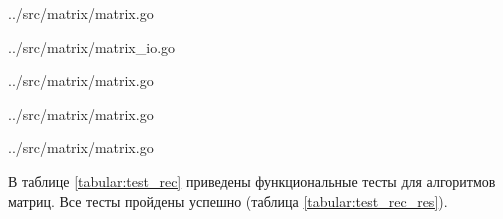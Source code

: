 \begin{lstinputlisting}[
	caption={Генератор матрицы},
	label={lst:generator},
	style={go},
	linerange={8-23},
	]{../src/matrix/matrix.go}
\end{lstinputlisting}

\begin{lstinputlisting}[
	caption={Функция для выделения памяти},
	label={lst:allocator},
	style={go},
	linerange={31-40},
	]{../src/matrix/matrix_io.go}
\end{lstinputlisting}

\begin{lstinputlisting}[
	caption={Классический алгоритм},
	label={lst:classic},
	style={go},
	linerange={29-39},
	]{../src/matrix/matrix.go}
\end{lstinputlisting}

\clearpage

\begin{lstinputlisting}[
	caption={Алгоритм Винограда без оптимизации},
	label={lst:winograd},
	style={go},
	linerange={41-82},
	]{../src/matrix/matrix.go}
\end{lstinputlisting}

\clearpage

\begin{lstinputlisting}[
	caption={Алгоритм Винограда c оптимизацией},
	label={lst:winograd_o},
	style={go},
	linerange={84-129},
	]{../src/matrix/matrix.go}
\end{lstinputlisting}


В таблице \ref{tabular:test_rec} приведены функциональные тесты для алгоритмов матриц. Все тесты пройдены успешно (таблица \ref{tabular:test_rec_res}).


